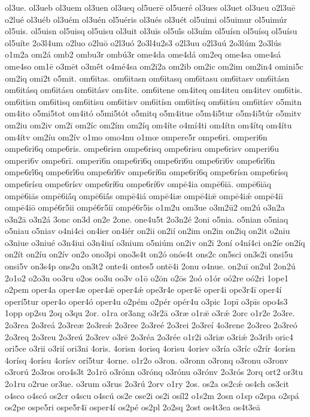 {ol3ue.
ol3ueb
ol3uem
ol3uen
ol3ueq
ol5uerē
ol5ueré
ol3ues
ol3uet
ol3ueu
o2l3uē
o2lué
ol3uéb
ol3uém
ol3uén
ol5uéris
ol3ués
ol3uét
ol5uimi
ol5uimur
ol5uimúr
ol5uis.
ol5uisn
ol5uisq
ol5uisu
ol3uit
ol3uīs
ol5uī́s
ol3uím
ol5uísn
ol5uísq
ol5uísu
ol5uíte
2o3l4um
o2luo
o2luō
o2l3uó
2o3l4u2s3
o2l3uu
o2l3uú
2o3lúm
2o3lús
o1m2a
om2á
omb2
ombu3r
ombú3r
ome4da
ome4dá
om2eq
ome4sa
ome4sá
ome4so
om1ē
o3mēt
o3mḗt
o4mé4sa
om2i2a
om2ib
om2ic
om2im
om2in4
omini5c
om2iq
omi2t
o5mit.
om6itas.
om6itasn
om6itasq
om6itasu
om6itasv
om6itásn
om6itásq
om6itásu
om6itásv
om4ite.
om6itene
om4iteq
om4iteu
om4itev
om6itis.
om6itisn
om6itisq
om6itisu
om6itisv
om6itísn
om6itísq
om6itísu
om6itísv
o5mitn
om4ito
o5mi5tot
om4itó
o5mi5tót
o5mitq
o5m4itue
o5m4i5tur
o5m4i5túr
o5mitv
om2iu
om2iv
om2ī
om2íc
om2ím
om2íq
om4íte
o4mí4ti
om4ítn
om4ítq
om4ítu
om4ítv
om2íu
om2ív
o1mo
omo4nu
o1mœ
ompere5r
ompe6ri.
omperi6n
ompe6ri6q
ompe6ris.
ompe6risn
ompe6risq
ompe6risu
ompe6risv
omperi6u
omperi6v
ompe6rī.
omperī6n
ompe6rī6q
ompe6rī6u
ompe6rī6v
ompe6rī́6n
ompe6rī́6q
ompe6rī́6u
ompe6rī́6v
ompe6rí6n
ompe6rí6q
ompe6rísn
ompe6rísq
ompe6rísu
ompe6rísv
ompe6rí6u
ompe6rí6v
ompē4ia
ompē6iā.
ompē6iāq
ompē6iās
ompē6iā́q
ompē6iā́s
ompē4iá
ompē4iæ
ompē4iǣ
ompē4iǽ
ompē4iī
ompē4iō
ompé6r5ii
ompé6r5iī
ompé6r5is
o1m2u
om3ue
o3m2ū2
om2ú
o3n2a
o3n2ā
o3n2á
3onc
on3d
on2e
2one.
one4u5t
2o3n2é
2oni
o5nia.
o5nian
o5niaq
o5niau
o5niav
o4ni4ci
on4ier
on4iér
on2ii
on2ií
on2im
on2in
on2iq
on2it
o2niu
o3niue
o3niué
o3n4iui
o3n4iuí
o3nium
o5niúm
on2iv
on2ī
2oní
o4ní4ci
on2íe
on2íq
on2ít
on2íu
on2ív
on2o
ono3pi
ono3s4t
on2ó
onós4t
ons2c
on5sci
on3s2i
onsi5u
onsi5v
on3s4p
ons2u
on3t2
onte4i
ontes5
ontē4i
2onu
o4nue.
on2uī
on2ul
2on2ú
2o1o2
o2o3n
oo3ru
o2os
oo3u
oo3v
o1ō
o2ōn
o2ōs
2oó
o1ór
oó2re
oó2ri
1ope1
o2pem
oper4a
oper4æ
oper4ǣ
oper4ǽ
ope3r4e
oper4ē
oper4i
ope3r4ī
oper4í
operí5tur
oper4o
oper4ó
oper4u
o2pém
o2pér
opér4u
o3pic
1opī
o3pīs
opo4s3
1opp
op2su
2oq
o3qu
2or.
o1ra
or3ang
o3r2ā
o3ræ
o1rǣ
o3rǽ
2orc
o1r2e
2o3re.
2o3rea
2o3reá
2o3reæ
2o3reǽ
2o3ree
2o3reé
2o3rei
2o3reí
4o3rene
2o3reo
2o3reó
2o3req
2o3reu
2o3reú
2o3rev
o3rē
2o3réa
2o3rée
o1r2i
o3riæ
o3riǽ
2o3rib
oric4
ori5ce
o3rii
o3rií
ori3ni
4oris.
4orisn
4orisq
4orisu
4orisv
o3ría
o3ríc
o2rír
4orísn
4orísq
4orísu
4orísv
orí5tur
4orne.
o1r2o
o3ron.
o3ronn
o3ronq
o3ronu
o3ronv
o3rorú
2o3ros
oro4s3t
2o1rō
o3rónn
o3rónq
o3rónu
o3rónv
2o3rós
2orq
ort2
or3tu
2o1ru
o2rue
or3ue.
o3rum
o3rus
2o3rú
2orv
o1ry
2os.
os2a
os2cǽ
os4ch
os3cit
o4sco
o4scó
os2cr
o4scu
o4scú
os2e
ose2i
os2i
osíl2
o1s2m
2osn
o1sp
o2spa
o2spá
os2pe
ospe5ri
ospe5r4ī
osper4í
os2pé
os2pl
2o2sq
2ost
os4t3ea
os4t3eā
}
